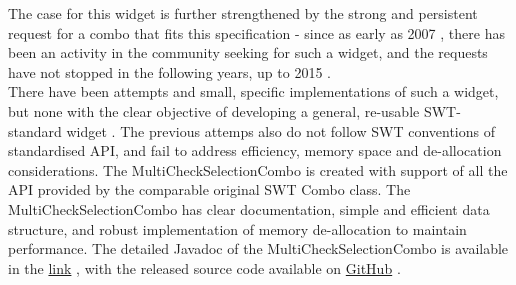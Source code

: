 The case for this widget is further strengthened by the strong and persistent request for a combo that fits this specification - since as early as 2007 \cite{2007}, there has been an activity in the community seeking for such a widget, and the requests have not stopped in the following years, up to 2015 \cite{2015}.\\
There have been attempts and small, specific implementations of such a widget, but none with the clear objective of developing a general, re-usable SWT-standard widget \cite{prev}. The previous attemps also do not follow SWT conventions of standardised API, and fail to address efficiency, memory space and de-allocation considerations. The MultiCheckSelectionCombo is created with support of all the API provided by the comparable original SWT Combo class. The MultiCheckSelectionCombo has clear documentation, simple and efficient data structure, and robust implementation of memory de-allocation to maintain performance. The detailed Javadoc of the MultiCheckSelectionCombo is available in the \href{https://lawhcd.github.io/SWTMultiCheckSelectionCombo/}{link} \cite{javadoc}, with the released source code available on \href{https://github.com/lawhcd/SWTMultiCheckSelectionCombo}{GitHub} \cite{mcsc}.

\newpage

